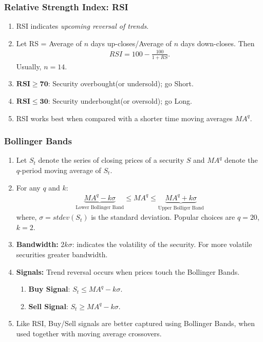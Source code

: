 \documentclass[slidestop,compress,mathserif,9pt]{beamer}
\def\be{\begin{enumerate}}
\def\ee{\end{enumerate}}
\begin{document}
\begin{frame}
\frametitle{Relative Strength Index: RSI}

\be
\item
RSI indicates \emph{upcoming reversal of trends}.

\item
Let RS = Average of $n$ days up-closes/{Average of $n$ days down-closes}. Then
\begin{eqnarray*}
RSI= 100 - \frac{100}{1+RS}.
\end{eqnarray*}
Usually, $n=14$.

\item
$\mathbf{RSI \ge 70}$: Security overbought(or undersold); go Short. 
\item 
$\mathbf{RSI \le 30}$: Security underbought(or oversold); go Long. 

\item
RSI works best when compared with a shorter time moving averages $MA^q$.


\ee


\end{frame}





\begin{frame}

\frametitle{Bollinger Bands}

\be

\item
Let $S_t$ denote the series of closing prices of a security $S$ and $MA^q$ denote the $q$-period moving average of $S_t$.
\item
For any $q$ and $k$:
\begin{eqnarray*}
\underbrace{MA^q - k\sigma}_\text{Lower Bollinger Band} \le MA^q \le \underbrace{MA^q + k\sigma}_\text{Upper Bolliger Band}
\end{eqnarray*}
where, $\sigma = stdev(S_t)$ is the standard deviation. Popular choices are $q=20$, $k=2$.
\item
\textbf{Bandwidth:} $2k\sigma$: indicates the volatility of the security. For more volatile securities greater bandwidth.
\item
\textbf{Signals:} Trend reversal occurs when prices touch the Bollinger Bands.
\be
\item \textbf{Buy Signal}: $S_t \le MA^q - k\sigma$.
\item \textbf{Sell Signal}: $S_t \ge MA^q - k\sigma$.
\ee
\item
Like RSI, Buy/Sell signals are better captured using Bollinger Bands, when used together with moving average crossovers.



\ee


\end{frame}
\end{document}
